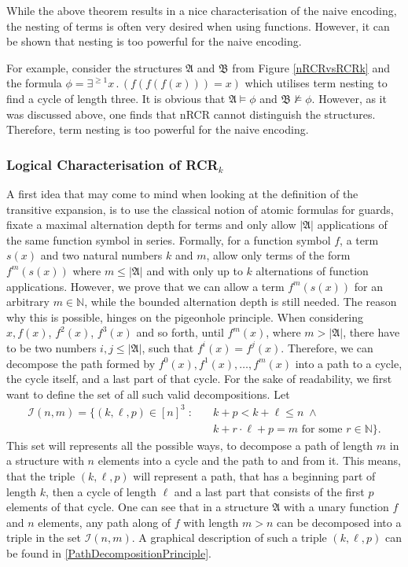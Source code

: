 While the above theorem results in a nice characterisation of the naive encoding, the nesting of terms is often very desired when using functions.
However, it can be shown that nesting is too powerful for the naive encoding.

For example, consider the structures $\mathfrak A$ and $\mathfrak B$ from Figure \ref{nRCRvsRCRk} and the formula $\phi=\exists^{\geq 1} x\operatorname{.}(f(f(f(x)))=x)$ which utilises term nesting to find a cycle of length three.
It is obvious that $\mathfrak A \models \phi$ and $\mathfrak B\not\models \phi$.
However, as it was discussed above, one finds that nRCR cannot distinguish the structures.
Therefore, term nesting is too powerful for the naive encoding.


\subsubsection{Logical Characterisation of RCR$_k$}

A first idea that may come to mind when looking at the definition of the transitive expansion, is to use the classical notion of atomic formulas for guards, fixate a maximal alternation depth for terms and only allow $\vert \mathfrak{A}\vert$ applications of the same function symbol in series.
Formally, for a function symbol $f$, a term $s(x)$ and two natural numbers $k$ and $m$, allow only terms of the form $f^m(s(x))$ where $m\leq\vert\mathfrak A\vert$ and with only up to $k$ alternations of function applications.
However, we prove that we can allow a term $f^m(s(x))$ for an arbitrary $m\in\mathbb N$, while the bounded alternation depth is still needed.
The reason why this is possible, hinges on the pigeonhole principle.
When considering $x,f(x)$, $f^2(x)$, $f^3(x)$ and so forth, until $f^m(x)$, where $m>\vert\mathfrak A\vert$, there have to be two numbers $i,j\leq \vert\mathfrak A\vert$, such that $f^i(x)=f^j(x)$.
Therefore, we can decompose the path formed by $f^0(x),f^1(x),\dots,f^m(x)$ into a path to a cycle, the cycle itself, and a last part of that cycle.
For the sake of readability, we first want to define the set of all such valid decompositions.
Let 
\begin{align*}
	\mathcal I(n,m)=\{(k,\ell,p)\in [n]^3 \;:\quad & k+p < k+\ell \leq n \; \land \\
	& k+r\cdot \ell + p = m \text{ for some } r\in \mathbb N\}.
\end{align*}
This set will represents all the possible ways, to decompose a path of length $m$ in a structure with $n$ elements into a cycle and the path to and from it.
This means, that the triple $(k,\ell,p)$ will represent a path, that has a beginning part of length $k$, then a cycle of length $\ell$ and a last part that consists of the first $p$ elements of that cycle.
One can see that in a structure $\mathfrak A$ with a unary function $f$ and $n$ elements, any path along of $f$ with length $m>n$ can be decomposed into a triple in the set $\mathcal I(n,m)$.
A graphical description of such a triple $(k,\ell,p)$ can be found in \cref{PathDecompositionPrinciple}.

